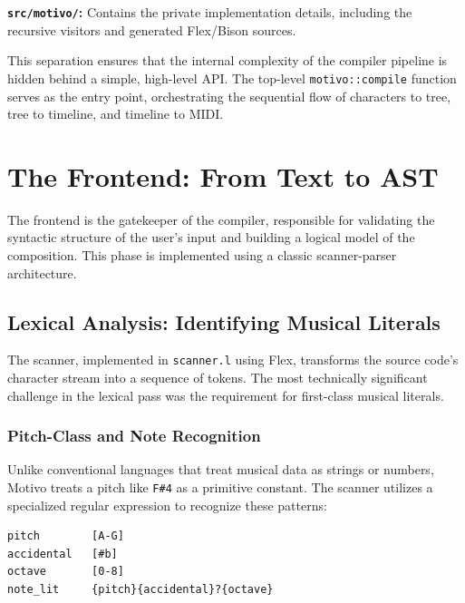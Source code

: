 \noindent \textbf{\texttt{src/motivo/}:} Contains the private implementation details, including the recursive
visitors and
generated Flex/Bison sources.

This separation ensures that the internal complexity of the compiler pipeline is hidden behind a simple, high-level
API\@.
The top-level \texttt{motivo::compile} function serves as the entry point, orchestrating the sequential flow
of characters
to tree, tree to timeline, and timeline to MIDI\@.


\section{The Frontend: From Text to AST}\label{detail-sec:implementation-frontend}

The frontend is the gatekeeper of the compiler, responsible for validating the syntactic structure of the user's input
and building a logical model of the composition.
This phase is implemented using a classic scanner-parser architecture.

\subsection{Lexical Analysis: Identifying Musical
Literals}\label{detail-subsec:lexical-analysis:-identifying-musical-literals}

The scanner, implemented in \texttt{scanner.l} using Flex, transforms the source code's character stream into a sequence
of tokens.
The most technically significant challenge in the lexical pass was the requirement for first-class musical literals.

\subsubsection{Pitch-Class and Note Recognition}

Unlike conventional languages that treat musical data as strings or numbers, Motivo treats a pitch like
\texttt{F\#4} as
a primitive constant.
The scanner utilizes a specialized regular expression to recognize these patterns:
\begin{lstlisting}[caption={Flex regular expression for note literal recognition.},label={detail-lst:lstlisting}]
pitch        [A-G]
accidental   [#b]
octave       [0-8]
note_lit     {pitch}{accidental}?{octave}
\end{lstlisting}

